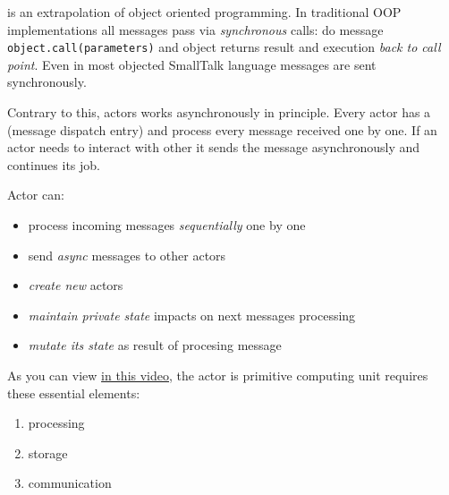 
 is an extrapolation of object oriented programming. In
traditional OOP implementations all messages pass via \emph{synchronous} calls:
do message \verb|object.call(parameters)| and object returns result and
execution \emph{back to call point}. Even in most objected SmallTalk
language messages are sent synchronously.

Contrary to this, actors works asynchronously in principle. Every actor has a
 (message dispatch entry) and process every message received one
by one. If an actor needs to interact with other it sends the message
asynchronously and continues its job.

\clearpage\noindent
Actor can:
\begin{itemize}[nosep]
  \item process incoming messages \emph{sequentially} one by one
  \item send \emph{async} messages to other actors
  \item \emph{create new} actors
  \item \emph{maintain private state} impacts on next messages processing
  \item \emph{mutate its state} as result of procesing message
\end{itemize}

\bigskip\noindent
As you can view \href{https://www.youtube.com/watch?v=7erJ1DV_Tlo}{in this
video}, the actor is primitive computing unit requires these essential 
elements:
\begin{enumerate}[nosep]
  \item processing
  \item storage
  \item communication
\end{enumerate} 